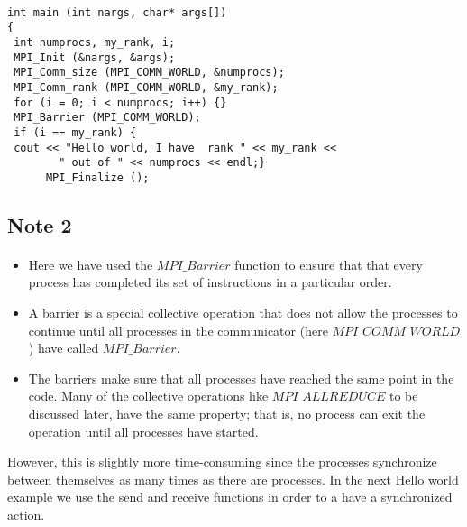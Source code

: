\documentclass[%
oneside,                 %
final,                   %
10pt]{article}
\begin{document}
\paragraph{}

\begin{verbatim}
int main (int nargs, char* args[])
{
 int numprocs, my_rank, i;
 MPI_Init (&nargs, &args);
 MPI_Comm_size (MPI_COMM_WORLD, &numprocs);
 MPI_Comm_rank (MPI_COMM_WORLD, &my_rank);
 for (i = 0; i < numprocs; i++) {}
 MPI_Barrier (MPI_COMM_WORLD);
 if (i == my_rank) {
 cout << "Hello world, I have  rank " << my_rank << 
        " out of " << numprocs << endl;}
      MPI_Finalize ();
\end{verbatim}




\subsection*{Note 2}

\paragraph{}
\begin{itemize}
\item Here we have used the $MPI\_Barrier$ function to ensure that that every process has completed  its set of instructions in  a particular order.

\item A barrier is a special collective operation that does not allow the processes to continue until all processes in the communicator (here $MPI\_COMM\_WORLD$) have called $MPI\_Barrier$. 

\item The barriers make sure that all processes have reached the same point in the code. Many of the collective operations like $MPI\_ALLREDUCE$ to be discussed later, have the same property; that is, no process can exit the operation until all processes have started. 
\end{itemize}

\noindent
However, this is slightly more time-consuming since the processes synchronize between themselves as many times as there
are processes.  In the next Hello world example we use the send and receive functions in order to a have a synchronized
action.
\end{document}
